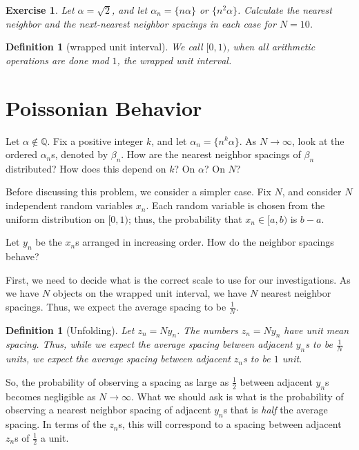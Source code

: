 \documentclass[12pt,letterpaper]{report}
\newcommand{\Q}{\mathbb{Q}}
\newcommand{\foh}{\frac{1}{2}}  %
\newtheorem{defi}[thm]{Definition}
\newtheorem{exe}[thm]{Exercise}
\begin{document}
\begin{exe} Let $\alpha = \sqrt{2}$, and let $\alpha_n = \{n
\alpha\}$ or $\{n^2 \alpha\}$. Calculate the nearest neighbor and
the next-nearest neighbor spacings in each case for $N = 10$.
\end{exe}

\begin{defi}[wrapped unit interval] We call $[0,1)$, when all arithmetic
operations are done mod $1$, the wrapped unit interval. \end{defi}

\section{Poissonian Behavior}

Let $\alpha \not\in \Q$. Fix a positive integer $k$, and let
$\alpha_n = \{n^k \alpha\}$. As $N \to \infty$, look at the
ordered $\alpha_n$s, denoted by $\beta_n$. How are the nearest
neighbor spacings of $\beta_n$ distributed? How does this depend
on $k$? On $\alpha$? On $N$?

Before discussing this problem, we consider a simpler case. Fix
$N$, and consider $N$ independent random variables $x_n$. Each
random variable is chosen from the uniform distribution on
$[0,1)$; thus, the probability that $x_n \in [a,b)$ is $b-a$.

Let $y_n$ be the $x_n$s arranged in increasing order. How do the
neighbor spacings behave?

First, we need to decide what is the correct scale to use for our
investigations. As we have $N$ objects on the wrapped unit
interval, we have $N$ nearest neighbor spacings. Thus, we expect
the average spacing to be $\frac{1}{N}$.

\begin{defi}[Unfolding] Let $z_n = N y_n$. The numbers
$z_n = N y_n$ have unit mean spacing. Thus, while we expect the
average spacing between adjacent $y_n$s to be $\frac{1}{N}$ units,
we expect the average spacing between adjacent $z_n$s to be $1$
unit.
\end{defi}

So, the probability of observing a spacing as large as
$\frac{1}{2}$ between adjacent $y_n$s becomes negligible as $N \to
\infty$. What we should ask is what is the probability of
observing a nearest neighbor spacing of adjacent $y_n$s that is
\emph{half} the average spacing. In terms of the $z_n$s, this will
correspond to a spacing between adjacent $z_n$s of $\foh$ a unit.
\end{document}
